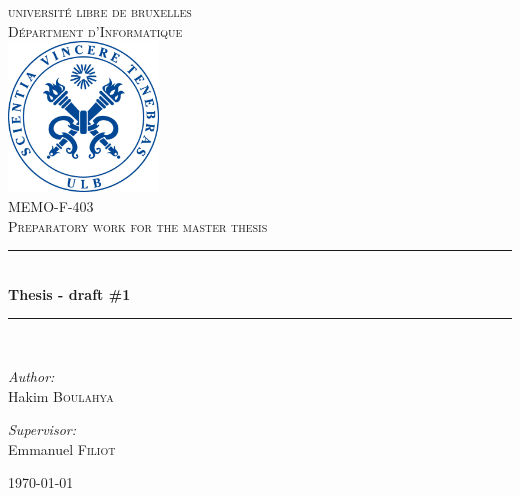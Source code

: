 \documentclass[letterpaper]{article}
\newcommand{\HRule}{\rule{\linewidth}{0.5mm}} %
\begin{document}
\begin{titlepage}
\begin{center}


\textsc{\LARGE universit\'e libre de bruxelles}\\[1.0cm]
\textsc{\Large D\'epartment d'Informatique}\\[1.5cm]

\includegraphics[width=0.3\textwidth]{images/ulblogo.jpg}~\\[1cm]

\textsc{
\large MEMO-F-403 \\
\Large  Preparatory work for the master thesis
 \\[1cm]}
\HRule \\[0.7cm]

{ \huge \bfseries Thesis - draft \#1 \\[0.7cm] }

\HRule \\[2cm]

\noindent
\begin{center} \large

\emph{Author:}\\
\Large Hakim \textsc{Boulahya}\\
\end{center}
\begin{center} \large

\emph{Supervisor:} \\
Emmanuel \textsc{Filiot} \\

\end{center}

\vfill

{\large \today}

\end{center}
\end{titlepage}

\tableofcontents
\newpage
\end{document}
